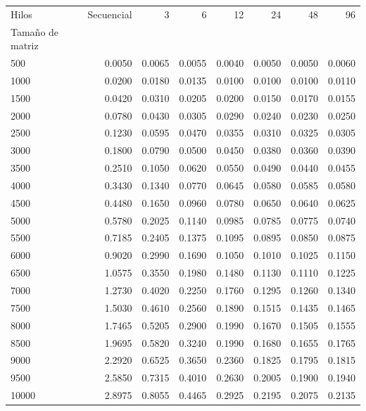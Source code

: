 \documentclass{report}
\begin{document}
\begin{appendices}
\begin{table}[H]
  \begin{tabular}{lrrrrrrr}
\toprule
Hilos &  Secuencial &       3 &       6 &      12 &      24 &      48 &      96 \\
Tamaño de matriz &             &         &         &         &         &         &         \\
\midrule
500              &      0.0050 &  0.0065 &  0.0055 &  0.0040 &  0.0050 &  0.0050 &  0.0060 \\
1000             &      0.0200 &  0.0180 &  0.0135 &  0.0100 &  0.0100 &  0.0100 &  0.0110 \\
1500             &      0.0420 &  0.0310 &  0.0205 &  0.0200 &  0.0150 &  0.0170 &  0.0155 \\
2000             &      0.0780 &  0.0430 &  0.0305 &  0.0290 &  0.0240 &  0.0230 &  0.0250 \\
2500             &      0.1230 &  0.0595 &  0.0470 &  0.0355 &  0.0310 &  0.0325 &  0.0305 \\
3000             &      0.1800 &  0.0790 &  0.0500 &  0.0450 &  0.0380 &  0.0360 &  0.0390 \\
3500             &      0.2510 &  0.1050 &  0.0620 &  0.0550 &  0.0490 &  0.0440 &  0.0455 \\
4000             &      0.3430 &  0.1340 &  0.0770 &  0.0645 &  0.0580 &  0.0585 &  0.0580 \\
4500             &      0.4480 &  0.1650 &  0.0960 &  0.0780 &  0.0650 &  0.0640 &  0.0625 \\
5000             &      0.5780 &  0.2025 &  0.1140 &  0.0985 &  0.0785 &  0.0775 &  0.0740 \\
5500             &      0.7185 &  0.2405 &  0.1375 &  0.1095 &  0.0895 &  0.0850 &  0.0875 \\
6000             &      0.9020 &  0.2990 &  0.1690 &  0.1050 &  0.1010 &  0.1025 &  0.1150 \\
6500             &      1.0575 &  0.3550 &  0.1980 &  0.1480 &  0.1130 &  0.1110 &  0.1225 \\
7000             &      1.2730 &  0.4020 &  0.2250 &  0.1760 &  0.1295 &  0.1260 &  0.1340 \\
7500             &      1.5030 &  0.4610 &  0.2560 &  0.1890 &  0.1515 &  0.1435 &  0.1465 \\
8000             &      1.7465 &  0.5205 &  0.2900 &  0.1990 &  0.1670 &  0.1505 &  0.1555 \\
8500             &      1.9695 &  0.5820 &  0.3240 &  0.1990 &  0.1680 &  0.1655 &  0.1765 \\
9000             &      2.2920 &  0.6525 &  0.3650 &  0.2360 &  0.1825 &  0.1795 &  0.1815 \\
9500             &      2.5850 &  0.7315 &  0.4010 &  0.2630 &  0.2005 &  0.1900 &  0.1940 \\
10000            &      2.8975 &  0.8055 &  0.4465 &  0.2925 &  0.2195 &  0.2075 &  0.2135 \\
\bottomrule
\end{tabular}


\end{table}
\end{appendices}
\end{document}
